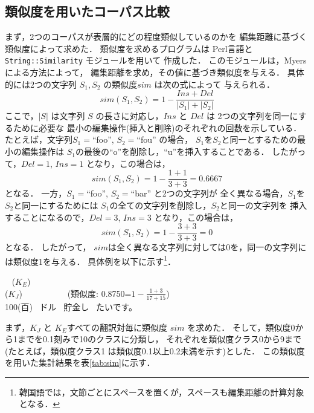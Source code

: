\subsection{類似度を用いたコーパス比較}
\label{sec:sim}

まず，2つのコーパスが表層的にどの程度類似しているのかを
編集距離に基づく類似度によって求めた．
類似度を求めるプログラムは
Perl言語と{\tt String::Similarity} モジュール\cite{Lehmann:2000}を用いて
作成した．
このモジュールは，Myers による方法\cite{Myers:1986}によって，
編集距離を求め，その値に基づき類似度を与える．
具体的には2つの文字列 $S_1, S_2$ の類似度$sim$ は次の式によって
与えられる．
\begin{equation}
 sim(S_1, S_2) = 1 - \frac{Ins + Del}{|S_1|+|S_2|} 
\end{equation}
ここで，$|S|$ は文字列 $S$ の長さに対応し，$Ins$ と $Del$ は
2つの文字列を同一にするために必要な
最小の編集操作(挿入と削除)のそれぞれの回数を示している．
たとえば，文字列$S_1=$``foo'', $S_2=$``fou'' の場合，
$S_1$を$S_2$と同一とするための最小の編集操作は
$S_1$の最後の``o''を削除し，``u''を挿入することである．
したがって，$Del=1$, $Ins=1$ となり，この場合は，
\[
sim(S_1,S_2)=1-\frac{1+1}{3+3}=0.6667
\]
となる．
一方，$S_1=$``foo'', $S_2=$``bar'' と2つの文字列が
全く異なる場合，$S_1$を$S_2$と同一にするためには
$S_1$の全ての文字列を削除し，$S_2$と同一の文字列を
挿入することになるので，$Del=3$, $Ins=3$ となり，この場合は，
\[
sim(S_1,S_2)=1-\frac{3+3}{3+3}=0
\]
となる．
したがって，
$sim$は全く異なる文字列に対しては0を，同一の文字列には類似度1を与える．
具体例を以下に示す\footnote{韓国語では，文節ごとにスペースを置くが，スペースも編集距離の計算対象となる．}．

\begin{exe}
  \ex {}  ~ 
 ($K_E$) 　\\
              
 ($K_J$) 　　　　　(類似度: 0.8750=$1-\frac{1+3}{17+15}$)\\
           100(百)~ ドル~ 貯金し~ たいです。 　\\
 
\end{exe}


まず，$K_J$ と $K_E$すべての翻訳対毎に類似度
$sim$ を求めた．
そして，類似度0から1までを0.1刻みで10のクラスに分類し，
それぞれを類似度クラス0から9まで(たとえば，類似度クラス1
は類似度0.1以上0.2未満を示す)とした．
この類似度を用いた集計結果を表\ref{tab:sim}に示す．

